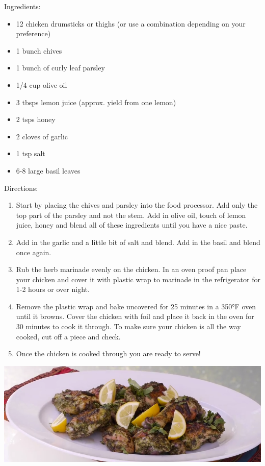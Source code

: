 \documentclass{article}
\begin{document}
%
%
%
%
%

\begin{multicols}{2}
Ingredients:
\begin{itemize}
\item 12 chicken drumsticks or thighs (or use a combination depending on your preference)
\item 1 bunch chives
\item 1 bunch of curly leaf parsley
\item 1/4 cup olive oil
\item 3 tbsps lemon juice (approx. yield from one lemon)
\item 2 tsps honey
\item 2 cloves of garlic
\item 1 tsp salt
\item 6-8 large basil leaves
\end{itemize}



\columnbreak

Directions:
\begin{enumerate}
\item Start by placing the chives and parsley into the food processor. Add only the top part of the parsley and not the stem. Add in olive oil, touch of lemon juice, honey and blend all of these ingredients until you have a nice paste.

\item Add in the garlic and a little bit of salt and blend. Add in the basil and blend once again.

\item Rub the herb marinade evenly on the chicken. In an oven proof pan place your chicken and cover it with plastic wrap to marinade in the refrigerator for 1-2 hours or over night.

\item Remove the plastic wrap and bake uncovered for 25 minutes in a 350°F oven until it browns. Cover the chicken with foil and place it back in the oven for 30 minutes to cook it through. To make sure your chicken is all the way cooked, cut off a piece and check.

\item Once the chicken is cooked through you are ready to serve!
\end{enumerate}
\end{multicols}



\begin{center}
\includegraphics[scale=0.4]{LemonHerbChicken.png}
\end{center}
\end{document}
